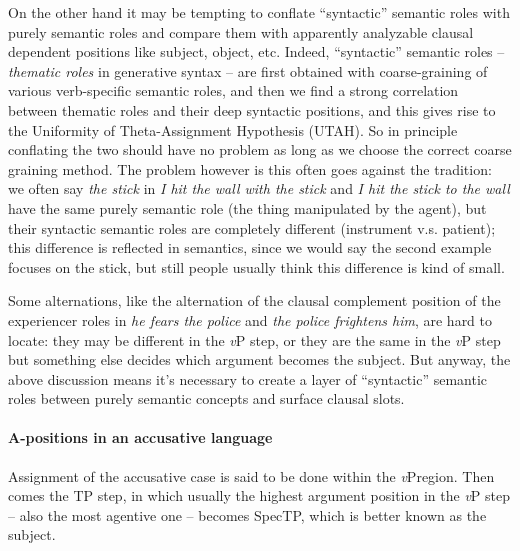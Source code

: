 \documentclass[a4paper, oneside, 12pt]{report}
\newcommand*{\term}[1]{\emph{#1}}
\newcommand{\form}[1]{\emph{#1}}
\newcommand{\vP}{\textit{v}P}
\begin{document}
{On the other hand it may be tempting to conflate 
``syntactic'' semantic roles with purely semantic roles 
and compare them with apparently analyzable clausal dependent positions 
like subject, object, etc.
Indeed, ``syntactic'' semantic roles -- \term{thematic roles} in generative syntax -- 
are first obtained with coarse-graining of 
various verb-specific semantic roles,
and then we find a strong correlation between thematic roles 
and their deep syntactic positions, 
and this gives rise to the Uniformity of Theta-Assignment Hypothesis (UTAH).
So in principle conflating the two should have no problem
as long as we choose the correct coarse graining method.
The problem however is this often goes against the tradition:
we often say \form{the stick} in \form{I hit the wall with the stick} and 
\form{I hit the stick to the wall}
have the same purely semantic role (the thing manipulated by the agent),
but their syntactic semantic roles are completely different
(instrument v.s. patient);
this difference is reflected in semantics, 
since we would say the second example focuses on the stick,
but still people usually think this difference is kind of small.

Some alternations, like the alternation of the clausal complement position of 
the experiencer roles in  
\form{he fears the police} and \form{the police frightens him},
are hard to locate: 
they may be different in the \vP{} step,
or they are the same in the \vP{} step but something else decides 
which argument becomes the subject.
But anyway, the above discussion means it's necessary to create 
a layer of ``syntactic'' semantic roles
between purely semantic concepts and surface clausal slots.

\paragraph{A-positions in an accusative language} 
Assignment of the accusative case is said to be done within the \vP region.
Then comes the TP step, in which
usually the highest argument position in the \vP{} step -- also the most agentive one --
becomes SpecTP, 
which is better known as the subject.

}
\end{document}
